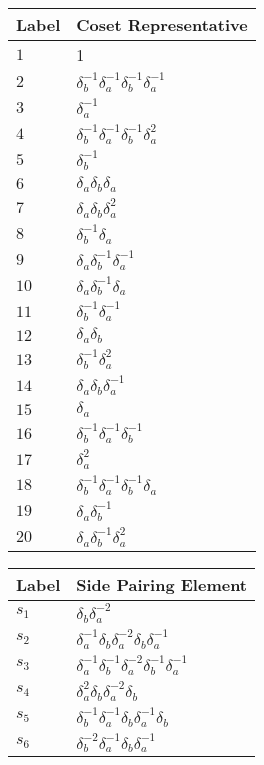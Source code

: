 \documentclass{article}
\begin{document}
\begin{center}
\begin{tabular}{ll}
\toprule
Label & Coset Representative\\
\midrule
$1$ & 1 \\
$2$ & $\delta_b^{-1}\delta_a^{-1}\delta_b^{-1}\delta_a^{-1}$ \\
$3$ & $\delta_a^{-1}$ \\
$4$ & $\delta_b^{-1}\delta_a^{-1}\delta_b^{-1}\delta_a^{2}$ \\
$5$ & $\delta_b^{-1}$ \\
$6$ & $\delta_a^{}\delta_b^{}\delta_a^{}$ \\
$7$ & $\delta_a^{}\delta_b^{}\delta_a^{2}$ \\
$8$ & $\delta_b^{-1}\delta_a^{}$ \\
$9$ & $\delta_a^{}\delta_b^{-1}\delta_a^{-1}$ \\
$10$ & $\delta_a^{}\delta_b^{-1}\delta_a^{}$ \\
$11$ & $\delta_b^{-1}\delta_a^{-1}$ \\
$12$ & $\delta_a^{}\delta_b^{}$ \\
$13$ & $\delta_b^{-1}\delta_a^{2}$ \\
$14$ & $\delta_a^{}\delta_b^{}\delta_a^{-1}$ \\
$15$ & $\delta_a^{}$ \\
$16$ & $\delta_b^{-1}\delta_a^{-1}\delta_b^{-1}$ \\
$17$ & $\delta_a^{2}$ \\
$18$ & $\delta_b^{-1}\delta_a^{-1}\delta_b^{-1}\delta_a^{}$ \\
$19$ & $\delta_a^{}\delta_b^{-1}$ \\
$20$ & $\delta_a^{}\delta_b^{-1}\delta_a^{2}$ \\
\bottomrule
\end{tabular}
\hfill
\begin{tabular}{ll}
\toprule
Label & Side Pairing Element\\
\midrule
$s_{1}$ & $\delta_b^{}\delta_a^{-2}$ \\
$s_{2}$ & $\delta_a^{-1}\delta_b^{}\delta_a^{-2}\delta_b^{}\delta_a^{-1}$ \\
$s_{3}$ & $\delta_a^{-1}\delta_b^{-1}\delta_a^{-2}\delta_b^{-1}\delta_a^{-1}$ \\
$s_{4}$ & $\delta_a^{2}\delta_b^{}\delta_a^{-2}\delta_b^{}$ \\
$s_{5}$ & $\delta_b^{-1}\delta_a^{-1}\delta_b^{}\delta_a^{-1}\delta_b^{}$ \\
$s_{6}$ & $\delta_b^{-2}\delta_a^{-1}\delta_b^{}\delta_a^{-1}$ \\

\end{tabular}
\end{center}
\end{document}

